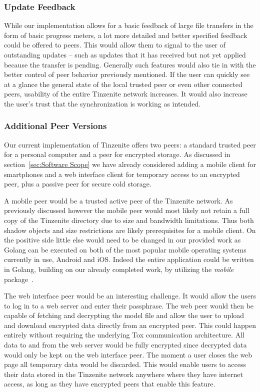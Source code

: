 \subsubsection{Update Feedback}
\label{subs:Update Feedback}

While our implementation allows for a basic feedback of large file transfers in the form of basic progress meters, a lot more detailed and better specified feedback could be offered to peers.
This would allow them to signal to the user of outstanding updates -- such as updates that it has received but not yet applied because the transfer is pending.
Generally such features would also tie in with the better control of peer behavior previously mentioned.
If the user can quickly see at a glance the general state of the local trusted peer or even other connected peers, usability of the entire Tinzenite network increases.
It would also increase the user's trust that the synchronization is working as intended.

\subsubsection{Additional Peer Versions}
\label{subs:Additional Peer Versions}

Our current implementation of Tinzenite offers two peers: a standard trusted peer for a personal computer and a peer for encrypted storage.
As discussed in section~\ref{sec:Software Scope} we have already considered adding a mobile client for smartphones and a web interface client for temporary access to an encrypted peer, plus a passive peer for secure cold storage.

A mobile peer would be a trusted active peer of the Tinzenite network.
As previously discussed however the mobile peer would most likely not retain a full copy of the Tinzenite directory due to size and bandwidth limitations.
Thus both shadow objects and size restrictions are likely prerequisites for a mobile client.
On the positive side little else would need to be changed in our provided work as Golang can be executed on both of the most popular mobile operating systems currently in use, Android and iOS.
Indeed the entire application could be written in Golang, building on our already completed work, by utilizing the \emph{mobile} package~\cite{web:site:golang:mobile}.

The web interface peer would be an interesting challenge.
It would allow the users to log in to a web server and enter their passphrase.
The web peer would then be capable of fetching and decrypting the model file and allow the user to upload and download encrypted data directly from an encrypted peer.
This could happen entirely without requiring the underlying Tox communication architecture.
All data to and from the web server would be fully encrypted since decrypted data would only be kept on the web interface peer.
The moment a user closes the web page all temporary data would be discarded.
This would enable users to access their data stored in the Tinzenite network anywhere where they have internet access, as long as they have encrypted peers that enable this feature.

